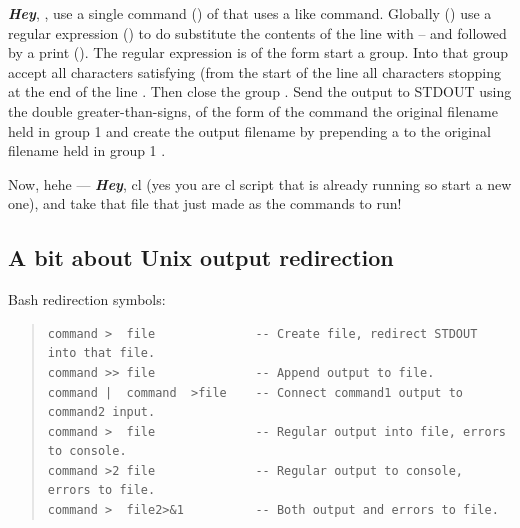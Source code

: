 \textbf{\emph{Hey}}, {\color{verbcolor}{\verb#sed#}}, use a single
command ({\color{verbcolor}{\verb#-e#}}) of
{\color{verbcolor}{\verb#'s/\(^.*$\)/crmedian \1 c_\1/'#}} that uses a
{\color{verbcolor}{\verb#g/re/p#}} like command. Globally
({\color{verbcolor}{\verb#g#}}) use a regular expression
({\color{verbcolor}{\verb#re#}}) {\color{verbcolor}{\verb#\(^.*$\)#}}
to do substitute the contents of the line with
{\color{verbcolor}{\verb#crmedian \1 c_\1#}} -- and followed by a
print ({\color{verbcolor}{\verb#p#}}).  The regular expression is of
the form {\color{verbcolor}{\verb#\(#}} start a group.  Into that
group accept all characters satisfying
{\color{verbcolor}{\verb#^.*$#}} (from the start of the line
{\color{verbcolor}{\verb#^#}} all characters
{\color{verbcolor}{\verb#.*#}} stopping at the end of the line
{\color{verbcolor}{\verb#$#}}. Then close the group
{\color{verbcolor}{\verb#\)#}}. Send the output to STDOUT using the
double greater-than-signs, of the form of the command
{\color{verbcolor}{\verb#crmedian#}} the original filename held in
group 1 {\color{verbcolor}{\verb#\1#}} and create the output filename
by prepending a {\color{verbcolor}{\verb#c_#}} to the original
filename held in group 1 {\color{verbcolor}{\verb#c_\1#}}.

Now, hehe --- \textbf{\emph{Hey}}, cl (yes you are cl script that is already running so
start a new one), and take that file that {\color{verbcolor}{\verb#sed#}}
just made as the commands to run!


\clearpage
\subsection{A bit about Unix output redirection}

Bash redirection symbols:

{\color{verbcolor}
\begin{quote}
\begingroup \fontsize{10pt}{10pt}
\selectfont
\begin{verbatim}
command >  file              -- Create file, redirect STDOUT into that file.
command >> file              -- Append output to file.
command |  command  >file    -- Connect command1 output to command2 input.
command >  file              -- Regular output into file, errors to console.
command >2 file              -- Regular output to console, errors to file.
command >  file2>&1          -- Both output and errors to file.
\end{verbatim}
\endgroup
\end{quote}
}


